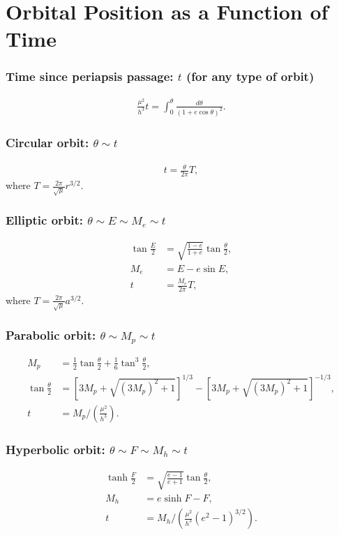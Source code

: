 \documentclass[10pt]{article}
\date{}
\newcommand{\bracket}[1]{\ensuremath{\left[ #1 \right]}}
\newcommand{\parenth}[1]{\ensuremath{\left( #1 \right)}}
\theoremstyle{plain}\theorembodyfont{\normalfont}
\begin{document}
\pagestyle{empty}
\section*{Orbital Position as a Function of Time}

\subsubsection*{Time since periapsis passage: $t$ (for any type of orbit)}

\begin{align}
\frac{\mu^2}{h^3} t= \int_{0}^\theta \frac{d\theta}{(1+e\cos\theta)^2}.
\end{align}

\subsubsection*{Circular orbit: $\theta\sim t$}

\begin{align}
t=\frac{\theta}{2\pi}T,
\end{align}
where $T=\frac{2\pi}{\sqrt{\mu}}r^{3/2}$.

\subsubsection*{Elliptic orbit: $\theta\sim E\sim M_e\sim t$}

\begin{align}
\tan \frac{E}{2} & = \sqrt{\frac{1-e}{1+e}}\tan\frac{\theta}{2},\\
M_e & = E- e\sin E,\\
t & = \frac{M_e}{2\pi}T,
\end{align}
where $T=\frac{2\pi}{\sqrt{\mu}}a^{3/2}$.

\subsubsection*{Parabolic orbit: $\theta \sim M_p \sim t$}

\begin{align}
M_p & = \frac{1}{2}\tan\frac{\theta}{2} + \frac{1}{6}\tan^3\frac{\theta}{2},\\
\tan\frac{\theta}{2} & = \bracket{3M_p + \sqrt{(3M_p)^2+1}}^{1/3}
-\bracket{3M_p + \sqrt{(3M_p)^2+1}}^{-1/3},\\
t & = M_p \Big/ \parenth{\frac{\mu^2}{h^3}}.
\end{align}

\subsubsection*{Hyperbolic orbit: $\theta\sim F\sim M_h\sim t$}

\begin{align}
\tanh \frac{F}{2} & = \sqrt{\frac{e-1}{e+1}} \tan \frac{\theta}{2},\\
M_h &= e \sinh F -F,\\
t &= M_h \Big/ \parenth{\frac{\mu^2}{h^3} (e^2-1)^{3/2}}.
\end{align}
\end{document}
